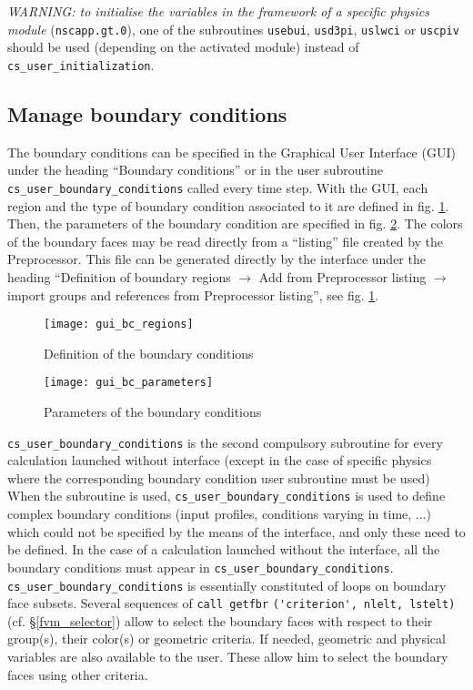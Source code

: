 {{{{\em WARNING: to initialise the variables in the framework of a
specific physics module} (\texttt{nscapp.gt.0}), 
one of the subroutines
\texttt{usebui}, \texttt{usd3pi}, \texttt{uslwci} or \texttt{uscpiv} 
should be used (depending on the activated module) instead of \texttt{cs\_user\_initialization}.

\subsection{Manage boundary conditions}
The boundary conditions can be specified in the Graphical User Interface (GUI) under the heading ``Boundary conditions'' or in the user subroutine \texttt{cs\_user\_boundary\_conditions} called every time step. With the GUI, each region and the type of boundary condition associated to it are defined in fig. \ref{fig:19_GUI}. Then, the parameters of the boundary condition are specified in fig. \ref{fig:20_GUI}. The colors of the boundary faces may be read directly from a ``listing'' file created by the Preprocessor. This file can be generated directly by the interface under the heading ``Definition of boundary regions $\rightarrow$ Add from Preprocessor listing $\rightarrow$ import groups and references from Preprocessor listing'', see fig. \ref{fig:19_GUI}.
%
\begin{figure}[!ht]
\begin{center}
\texttt{[image: gui\_bc\_regions]}
\caption{Definition of the boundary conditions}
\label{fig:19_GUI}
\end{center}
\end{figure}
%
\begin{figure}[!ht]
\begin{center}
\texttt{[image: gui\_bc\_parameters]}
\caption{Parameters of the boundary conditions}
\label{fig:20_GUI}
\end{center}
\end{figure}

\texttt{cs\_user\_boundary\_conditions} is the second compulsory subroutine for every calculation launched
without interface (except in the case of specific physics where the
corresponding boundary condition user subroutine must be used)  \\
When the subroutine is used, \texttt{cs\_user\_boundary\_conditions} is used to define complex
boundary conditions (input profiles, conditions varying in time, ...)
which could not be specified by the means of the interface, and only these
need to be defined. In the case of a calculation launched without the
interface, all the boundary conditions must appear in \texttt{cs\_user\_boundary\_conditions}.\\
\texttt{cs\_user\_boundary\_conditions} is essentially constituted of loops on boundary
face subsets. Several sequences 
of \verb+call getfbr+ \verb+('criterion', nlelt, lstelt)+ (cf.
\S\ref{fvm_selector}) allow to select 
the boundary faces with respect to their group(s), their
color(s) or geometric criteria. If needed, geometric and
physical variables are also available to the user. These allow him
to select the boundary faces using other criteria.

}}}
